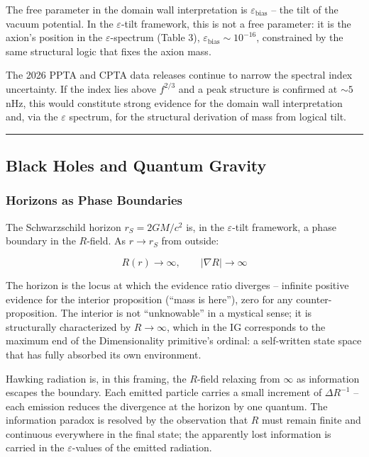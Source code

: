 \documentclass[12pt,a4paper]{article}
\begin{document}
The free parameter in the domain wall interpretation is
\(\varepsilon_\text{bias}\) -- the tilt of the vacuum potential. In the
\(\varepsilon\)-tilt framework, this is not a free parameter: it is the
axion's position in the \(\varepsilon\)-spectrum (Table 3),
\(\varepsilon_\text{bias} \sim 10^{-16}\), constrained by the same
structural logic that fixes the axion mass.

The 2026 PPTA and CPTA data releases continue to narrow the spectral
index uncertainty. If the index lies above \(f^{2/3}\) and a peak
structure is confirmed at \(\sim 5\) nHz, this would constitute strong
evidence for the domain wall interpretation and, via the \(\varepsilon\)
spectrum, for the structural derivation of mass from logical tilt.

\begin{center}\rule{0.5\linewidth}{0.5pt}\end{center}

\hypertarget{black-holes-and-quantum-gravity}{%
\subsection{Black Holes and Quantum
Gravity}\label{black-holes-and-quantum-gravity}}

\hypertarget{horizons-as-phase-boundaries}{%
\subsubsection{Horizons as Phase
Boundaries}\label{horizons-as-phase-boundaries}}

The Schwarzschild horizon \(r_S = 2GM/c^2\) is, in the
\(\varepsilon\)-tilt framework, a phase boundary in the \(R\)-field. As
\(r \to r_S\) from outside:

\[R(r) \to \infty, \qquad |\nabla R| \to \infty\]

The horizon is the locus at which the evidence ratio diverges --
infinite positive evidence for the interior proposition (``mass is
here''), zero for any counter-proposition. The interior is not
``unknowable'' in a mystical sense; it is structurally characterized by
\(R \to \infty\), which in the IG corresponds to the maximum end of the
Dimensionality primitive's ordinal: a self-written state space that has
fully absorbed its own environment.

Hawking radiation is, in this framing, the \(R\)-field relaxing from
\(\infty\) as information escapes the boundary. Each emitted particle
carries a small increment of \(\Delta R^{-1}\) -- each emission reduces
the divergence at the horizon by one quantum. The information paradox is
resolved by the observation that \(R\) must remain finite and continuous
everywhere in the final state; the apparently lost information is
carried in the \(\varepsilon\)-values of the emitted radiation.
\end{document}

